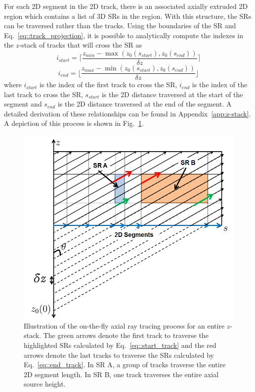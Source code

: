 For each 2D segment in the 2D track, there is an associated axially extruded 2D region which contains a list of 3D \ac{SR}s in the region. With this structure, the \ac{SR}s can be traversed rather than the tracks. Using the boundaries of the \ac{SR} and Eq.~\ref{eq::track_projection}, it is possible to analytically compute the indexes in the $z$-stack of tracks that will cross the \ac{SR} as
\begin{equation}
i_{\textit{start}} = \Bigg\lceil\frac{z_{\textit{min}} - \max\left({z_0(s_{\textit{start}}), z_0(s_{\textit{end}})}\right) }{\delta z}\Bigg\rceil
\label{eq::start_track}
\end{equation}
\begin{equation}
i_{\textit{end}} = \Bigg\lfloor\frac{z_{\textit{max}} - \min\left({z_0(s_{\textit{start}}), z_0(s_{\textit{end}})}\right) }{\delta z}\Bigg\rfloor
\label{eq::end_track}
\end{equation}
where $i_{\textit{start}}$ is the index of the first track to cross the \ac{SR}, $i_{\textit{end}}$ is the index of the last track to cross the \ac{SR}, $s_{\textit{start}}$ is the 2D distance traversed at the start of the segment and $s_{\textit{end}}$ is the 2D distance traversed at the end of the segment. A detailed derivation of these relationships can be found in Appendix~\ref{app:z-stack}. A depiction of this process is shown in Fig.~\ref{fig::stack_tracing}.

\begin{figure}[ht!]
	\centering
	\includegraphics[width=0.75\linewidth]{figures/ph2016/stack_tracing.png}
	\caption{Illustration of the on-the-fly axial ray tracing process for an entire $z$-stack. The green arrows denote the first track to traverse the highlighted \ac{SR}s calculated by Eq.~\ref{eq::start_track} and the red arrows denote the last tracks to traverse the \ac{SR}s calculated by Eq.~\ref{eq::end_track}. In \ac{SR} A, a group of tracks traverse the entire 2D segment length. In \ac{SR} B, one track traverses the entire axial source height.}
	\label{fig::stack_tracing}
\end{figure}


